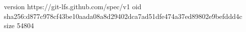 version https://git-lfs.github.com/spec/v1
oid sha256:d877c978cf43be10aada08a8d29402dca7ad51dfe474a37ed89802e9befddd4c
size 54804
